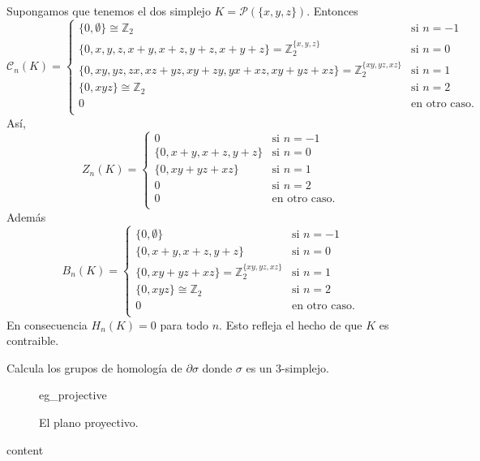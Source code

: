 \documentclass{standalone}
\begin{document}
	\begin{example}
		Supongamos que tenemos el dos simplejo $K=\mathcal{P}(\{x,y,z\})$. Entonces
		\begin{equation}
			\mathcal{C}_{n}(K)=
			\begin{cases}
				\{0,\emptyset\}\cong\mathbb{Z}_{2} &\text{si }n=-1\\
				\{0,x,y,z,x+y,x+z,y+z,x+y+z\}=\mathbb{Z}_{2}^{\{x,y,z\}} &\text{si }n=0\\
				\{0,xy,yz,zx,xz+yz,xy+zy,yx+xz,xy+yz+xz\}=\mathbb{Z}_{2}^{\{xy,yz,xz\}} &\text{si }n=1\\
				\{0,xyz\}\cong\mathbb{Z}_{2} &\text{si }n=2\\
				0 &\text{en otro caso.}\\
			\end{cases}
		\end{equation}
		Así, 
		\begin{equation}
			Z_{n}(K)=
			\begin{cases}
				0 &\text{si }n=-1\\
				\{0,x+y,x+z,y+z\} &\text{si }n=0\\
				\{0,xy+yz+xz\} &\text{si }n=1\\
				0 &\text{si }n=2\\
				0 &\text{en otro caso.}\\
			\end{cases}
		\end{equation}
		Además 
		\begin{equation}
			B_{n}(K)=
			\begin{cases}
				\{0,\emptyset\} &\text{si }n=-1\\
				\{0,x+y,x+z,y+z\} &\text{si }n=0\\
				\{0,xy+yz+xz\}=\mathbb{Z}_{2}^{\{xy,yz,xz\}} &\text{si }n=1\\
				\{0,xyz\}\cong\mathbb{Z}_{2} &\text{si }n=2\\
				0 &\text{en otro caso.}\\
			\end{cases}
		\end{equation}
		En consecuencia $H_{n}(K)=0$ para todo $n$. Esto refleja el hecho de que $K$ es contraible.
	\end{example}
	
	\begin{exercise}
		Calcula los grupos de homología de $\partial\sigma$ donde $\sigma$ es un $3$-simplejo.
	\end{exercise}
	
	\begin{figure}[h]
		\centering
		{eg_projective}
		\caption{El plano proyectivo.}
		\label{fig:projective}
	\end{figure}
	
	\begin{example}
		content
	\end{example}
\end{document}
